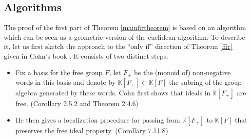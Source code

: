\documentclass[11pt,letterpaper]{amsart}
\newtheorem*{example}{Example}
\begin{document}
\subsection*{Algorithms}
The proof of the first part of Theorem \ref{mainfirtheorem} is based on an algorithm which can be seen as a geometric version of the euclidean algorithm. %
To describe it, let us first sketch the approach to the ``only if'' direction of Theorem \ref{ffir} given in Cohn's book \cite{cohnbook}. It consists of two distinct steps: 
\begin{itemize}
\item
Fix a basis for the free group $F$, let $F_+$ be the (monoid of) non-negative words in this basis and denote by $\mathbb K[F_+]\subset\mathbb K[F]$ the subring of the group algebra generated by these words. Cohn first shows that ideals in $\mathbb K[F_+]$ are free. (Corollary 2.5.2 and Theorem 2.4.6) 
\item
He then gives a localization procedure for passing from $\mathbb K[F_+]$ to $\mathbb K[F]$ that preserves the free ideal property. (Corollary 7.11.8)
\end{itemize}
\end{document}
